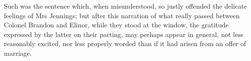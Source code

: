 Such was the sentence which, when misunderstood, so justly offended the delicate feelings of Mrs Jennings; but after this narration of what really passed between Colonel Brandon and Elinor, while they stood at the window, the gratitude expressed by the latter on their parting, may perhaps appear in general, not less reasonably excited, nor less properly worded than if it had arisen from an offer of marriage.